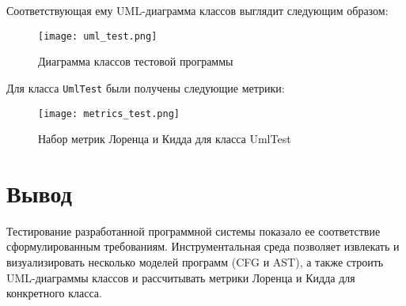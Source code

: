 Соответствующая ему UML-диаграмма классов выглядит следующим образом:

\begin{figure}[h]
    \begin{center}
        \texttt{[image: uml\_test.png]}
    \end{center}
    \caption{Диаграмма классов тестовой программы}
    \label{fig:uml_test}
\end{figure}
\newpage

Для класса \texttt{UmlTest} были получены следующие метрики:

\begin{figure}[h]
    \begin{center}
        \texttt{[image: metrics\_test.png]}
    \end{center}
    \caption{Набор метрик Лоренца и Кидда для класса UmlTest}
    \label{fig:metrics_test}
\end{figure}

\section{Вывод}

Тестирование разработанной программной системы показало ее соответствие
сформулированным требованиям. Инструментальная среда позволяет извлекать и
визуализировать несколько моделей программ (CFG и AST), а также строить
UML-диаграммы классов и рассчитывать метрики Лоренца и Кидда для конкретного
класса.
